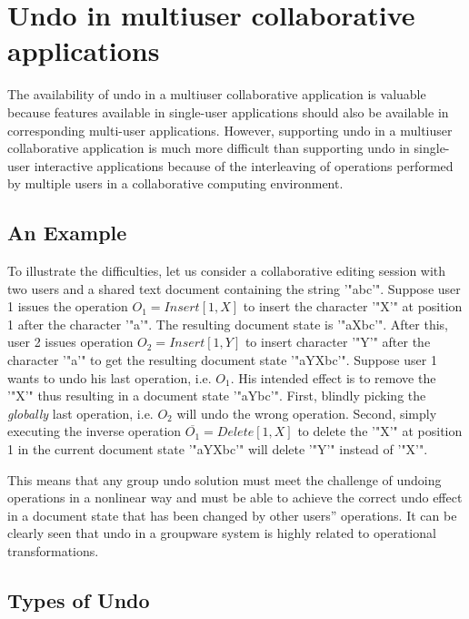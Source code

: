 \appendix

\section{Undo in multiuser collaborative applications}
\label{sect:undo}

The availability of undo in a multiuser collaborative application is valuable because features available in single-user applications should also be available in corresponding multi-user applications. However, supporting undo in a multiuser collaborative application is much more difficult than supporting undo in single-user interactive applications because of the interleaving of operations performed by multiple users in a collaborative computing environment.


\subsection{An Example}

To illustrate the difficulties, let us consider a collaborative editing session with two users and a shared text document containing the string '"abc'". Suppose user 1 issues the operation $O_{1} = Insert[1,X]$ to insert the character '"X'" at position 1 after the character '"a'". The resulting document state is '"aXbc'". After this, user 2 issues operation $O_{2} = Insert[1,Y]$ to insert character '"Y'" after the character '"a'" to get the resulting document state '"aYXbc'". Suppose user 1 wants to undo his last operation, i.e. $O_{1}$. His intended effect is to remove the '"X'" thus resulting in a document state '"aYbc'". First, blindly picking the \emph{globally} last operation, i.e. $O_{2}$ will undo the wrong operation. Second, simply executing the inverse operation $\overline{O_{1}} = Delete[1,X]$ to delete the '"X'" at position 1 in the current document state '"aYXbc'" will delete '"Y'" instead of '"X'".

This means that any group undo solution must meet the challenge of undoing operations in a nonlinear way and must be able to achieve the correct undo effect in a document state that has been changed by other users'' operations. It can be clearly seen that undo in a groupware system is highly related to operational transformations.


\subsection{Types of Undo}


